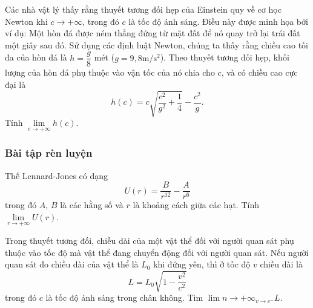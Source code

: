 \begin{vd}%
	Các nhà vật lý  thấy rằng thuyết tương đối hẹp của Einstein quy về cơ học Newton khi $c \rightarrow +\infty$, trong đó $c$ là tốc độ ánh sáng. Điều này được minh họa bởi ví dụ: Một hòn đá được ném thẳng đứng từ mặt đất để nó quay trở lại trái đất một giây sau đó. Sử dụng các định luật Newton, chúng ta thấy rằng chiều cao tối đa của hòn đá là $h=\dfrac{g}{8}$ mét ($g = 9{,}8 \mathrm{m/ s ^2}$). Theo thuyết tương đối hẹp, khối lượng của hòn đá phụ thuộc vào vận tốc của nó chia cho $c$, và có chiều cao cực đại là 
	\[
	h(c)=c \sqrt{\dfrac{c^2}{g^2}+\dfrac{1}{4}}- \dfrac{c^2}{g}.
	\]
	Tính $\lim\limits _{c \rightarrow +\infty} h(c)$.
\end{vd}

\subsubsection{Bài tập rèn luyện}
\begin{bt}%
	Thế Lennard-Jones có dạng $$U(r) = \dfrac{B}{r^{12}} - \dfrac{A}{r^6}$$ trong đó $A$, $B$ là các hằng số và $r$ là khoảng cách giữa các hạt. 
	Tính $\lim\limits _{r \rightarrow +\infty} U(r)$.
\end{bt}

\begin{bt}%
	Trong thuyết tương đối, chiều dài của một vật thể đối với người quan sát phụ thuộc vào tốc độ mà vật thể đang chuyển động đối với người quan sát. Nếu người quan sát đo chiều dài của vật thể là $L_0$ khi đứng yên, thì ở tốc độ $v$ chiều dài  là
	$$
	L=L_0 \sqrt{1-\frac{v^2}{c^2}}
	$$
	trong đó $c$ là tốc độ ánh sáng trong chân không. Tìm $\displaystyle \lim \limits{n \to +\infty}_{v \rightarrow c^{-}} L$. 
\end{bt}

